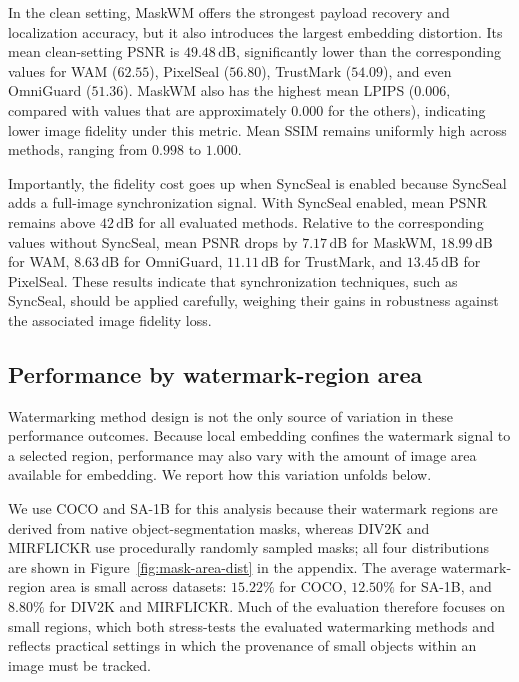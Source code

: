 \documentclass[sigconf,nonacm]{acmart}
\begin{document}
In the clean setting, MaskWM offers the strongest payload recovery and localization accuracy, but it also introduces the largest embedding distortion. Its mean clean-setting PSNR is \(49.48\,\mathrm{dB}\), significantly lower than the corresponding values for WAM (\(62.55\)), PixelSeal (\(56.80\)), TrustMark (\(54.09\)), and even OmniGuard (\(51.36\)).
MaskWM also has the highest mean LPIPS (\(0.006\), compared with values that are approximately \(0.000\) for the others), indicating lower image fidelity under this metric.
Mean SSIM remains uniformly high across methods, ranging from \(0.998\) to \(1.000\).

Importantly, the fidelity cost goes up when SyncSeal is enabled because SyncSeal adds a full-image synchronization signal. With SyncSeal enabled, mean PSNR remains above \(42\,\mathrm{dB}\) for all evaluated methods. Relative to the corresponding values without SyncSeal, mean PSNR drops by \(7.17\,\mathrm{dB}\) for MaskWM, \(18.99\,\mathrm{dB}\) for WAM, \(8.63\,\mathrm{dB}\) for OmniGuard, \(11.11\,\mathrm{dB}\) for TrustMark, and \(13.45\,\mathrm{dB}\) for PixelSeal. These results indicate that synchronization techniques, such as SyncSeal, should be applied carefully, weighing their gains in robustness against the associated image fidelity loss.



\subsection{Performance by watermark-region area}

Watermarking method design is not the only source of variation in these performance outcomes. Because local embedding confines the watermark signal to a selected region, performance may also vary with the amount of image area available for embedding. We report how this variation unfolds below.

We use COCO and SA-1B for this analysis because their watermark regions are derived from native object-segmentation masks, whereas DIV2K and MIRFLICKR use procedurally randomly sampled masks; all four distributions are shown in Figure~\ref{fig:mask-area-dist} in the appendix.
The average watermark-region area is small across datasets: \(15.22\%\) for COCO, \(12.50\%\) for SA-1B, and \(8.80\%\) for DIV2K and MIRFLICKR.
Much of the evaluation therefore focuses on small regions, which both stress-tests the evaluated watermarking methods and reflects practical settings in which the provenance of small objects within an image must be tracked.
\end{document}
